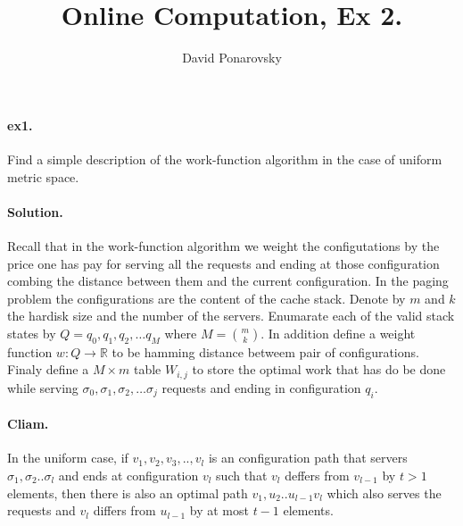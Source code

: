 \documentclass{article}
\newcommand{\expp}[1]{ \mathbf{E} \left[ {#1} \right]}
\begin{document}
\newcommand{\dalg}[1]{\expp{#1 : \text{alg} \sim \tilde{\text{alg}}}}
\newcommand{\dsig}[1]{\expp{#1 : \sigma \sim \tilde{\sigma}}}
\newcommand{\calg}{c_{\text{alg}}}
\newcommand{\cbase}{c_{\text{base}}}


\title{Online Computation, Ex 2. } 
\author{David Ponarovsky}
\maketitle

\begin{multicols*}{2}
  \paragraph{ex1.} Find a simple description of the work-function algorithm in the case of uniform metric space. 
  \paragraph{Solution.} Recall that in the work-function algorithm we weight the configutations by the price one has pay for serving all the requests and ending at those configuration combing the distance between them and the current configuration. In the paging problem the configurations are the content of the cache stack.  
  Denote by $m$ and $k$ the hardisk size and the number of the servers. Enumarate each of the valid stack states by $Q = q_{0},q_{1},q_{2},\dots q_{M}$  where $M = \binom{m}{k}$. In addition define a weight function $w : Q \rightarrow \mathbb{R}$ to be hamming distance betweem pair of configurations. Finaly define a $M \times m$ table $W_{i,j}$ to store the optimal work that has do be done while serving $\sigma_{0},\sigma_{1},\sigma_{2},\dots \sigma_{j}$ requests and ending in configuration $q_{i}$.     

  \paragraph{Cliam.} In the uniform case, if $v_{1},v_{2},v_{3},..,v_{l}$ is an configuration path that servers $\sigma_{1},\sigma_{2}..\sigma_{l}$ and ends at configuration $v_{l}$ such that $v_{l}$ deffers from $v_{l-1}$ by $t > 1$ elements, then there is also an optimal path $v_{1},u_{2}..u_{l-1}v_{l}$ which also serves the requests and $v_{l}$ differs from $u_{l-1}$ by at most $t-1$ elements. 

\end{multicols*}
\end{document}
